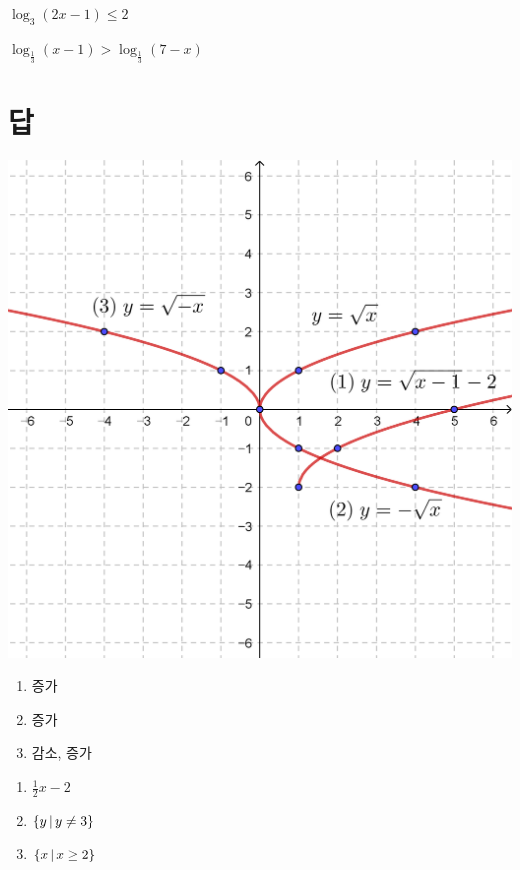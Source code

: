 \documentclass{oblivoir}
\begin{document}
%
\label{ineq4}
\begin{enumerate*}[itemjoin=\tabto{.5\textwidth}]
\item
\(\log_3(2x-1)\le2\)
\item
\(\log_{\frac13}(x-1)>\log_{\frac13}(7-x)\)
\end{enumerate*}

\section*{답}
\begin{multicols*}{2}
%
\begin{center}
\includegraphics[width=\columnwidth]{review_2}
\end{center}

%

%
\begin{enumerate}
\item
증가
\item
증가
\item
감소, 증가
\end{enumerate}

%
\begin{enumerate}
\item
\(\frac12x-2\)
\item
\(\{y\,|\, y\neq3\}\)
\item
\(\{x\,|\, x\ge2\}\)
\end{enumerate}


\end{multicols*}
\end{document}
